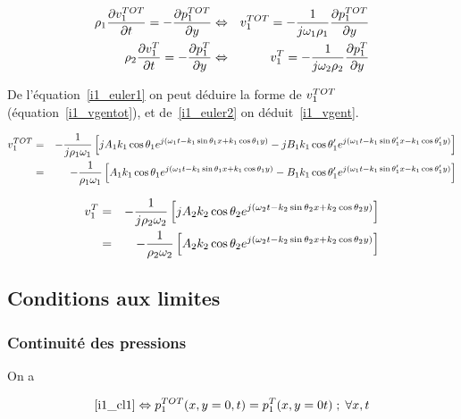 \begin{eqnarray}
    \rho_1\frac{\partial v^{TOT}_1}{\partial t} = -\frac{\partial p^{TOT}_1}{\partial y}
        & \Leftrightarrow & v^{TOT}_1 = -\frac{1}{j\omega_1\rho_1}\frac{\partial p^{TOT}_1}{\partial y}\label{i1_euler1} \\
    \rho_2\frac{\partial v^T_1}{\partial t} = -\frac{\partial p^T_1}{\partial y}
        & \Leftrightarrow & v^T_1 = -\frac{1}{j\omega_2\rho_2}\frac{\partial p^T_1}{\partial y}\label{i1_euler2}
\end{eqnarray}

De l'équation~\eqref{i1_euler1} on peut déduire la forme de $v^{TOT}_1$ (équation~\eqref{i1_vgentot}), et
de~\eqref{i1_euler2} on déduit~\eqref{i1_vgent}.

\begin{eqnarray}
    v^{TOT}_1
        & = & -\frac{1}{j\rho_1\omega_1}\left[ jA_1k_1\cos\theta_1e^{j(\omega_1t-k_1\sin\theta_1x+k_1\cos\theta_1y)} -
            jB_1k_1\cos\theta_1'e^{j(\omega_1t-k_1\sin\theta_1'x-k_1\cos\theta_1'y)}\right]\notag\\
        & = & -\frac{1}{\rho_1\omega_1}\left[A_1k_1\cos\theta_1e^{j(\omega_1t-k_1\sin\theta_1x+k_1\cos\theta_1y)} -
            B_1k_1\cos\theta_1'e^{j(\omega_1t-k_1\sin\theta_1'x-k_1\cos\theta_1'y)}\right] \label{i1_vgentot}
\end{eqnarray}

\begin{eqnarray}
    v^T_1
        & = &
    -\frac{1}{j\rho_2\omega_2}\left[jA_2k_2\cos\theta_2e^{j(\omega_2t-k_2\sin\theta_2x+k_2\cos\theta_2y)}\right]\notag\\
        & = &
    -\frac{1}{\rho_2\omega_2}\left[A_2k_2\cos\theta_2e^{j(\omega_2t-k_2\sin\theta_2x+k_2\cos\theta_2y)}\right]
    \label{i1_vgent}
\end{eqnarray}

\subsection{Conditions aux limites}

\subsubsection{Continuité des pressions}

On a 

\begin{equation*}
\eqref{i1_cl1} \Leftrightarrow p^{TOT}_1(x,y=0,t) = p^T_1(x, y=0 t) \;;\; \forall x,t 
\end{equation*}

